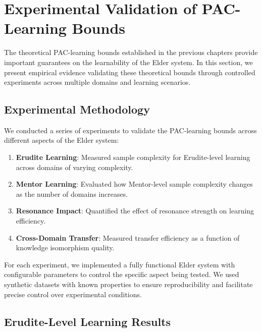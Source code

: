 \section{Experimental Validation of PAC-Learning Bounds}

The theoretical PAC-learning bounds established in the previous chapters provide important guarantees on the learnability of the Elder system. In this section, we present empirical evidence validating these theoretical bounds through controlled experiments across multiple domains and learning scenarios.



\subsection{Experimental Methodology}

We conducted a series of experiments to validate the PAC-learning bounds across different aspects of the Elder system:

\begin{enumerate}
    \item \textbf{Erudite Learning}: Measured sample complexity for Erudite-level learning across domains of varying complexity.
    
    \item \textbf{Mentor Learning}: Evaluated how Mentor-level sample complexity changes as the number of domains increases.
    
    \item \textbf{Resonance Impact}: Quantified the effect of resonance strength on learning efficiency.
    
    \item \textbf{Cross-Domain Transfer}: Measured transfer efficiency as a function of knowledge isomorphism quality.
\end{enumerate}

For each experiment, we implemented a fully functional Elder system with configurable parameters to control the specific aspect being tested. We used synthetic datasets with known properties to ensure reproducibility and facilitate precise control over experimental conditions.

\subsection{Erudite-Level Learning Results}

